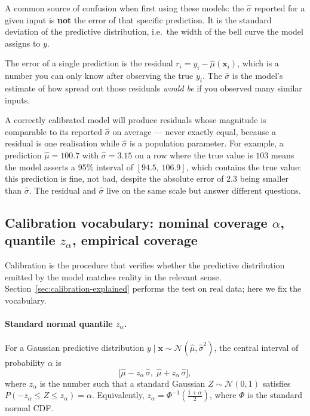 \documentclass[11pt,a4paper]{article}
\begin{document}
\begin{recapbox}
A common source of confusion when first using these models: the $\hat\sigma$ reported for a given input is \textbf{not} the error of that specific prediction. It is the standard deviation of the predictive distribution, i.e.\ the width of the bell curve the model assigns to $y$.

The error of a single prediction is the residual $r_i = y_i - \hat\mu(\bm x_i)$, which is a number you can only know after observing the true $y_i$. The $\hat\sigma$ is the model's estimate of how spread out those residuals \emph{would be} if you observed many similar inputs.

A correctly calibrated model will produce residuals whose magnitude is comparable to its reported $\hat\sigma$ on average --- never exactly equal, because a residual is one realisation while $\hat\sigma$ is a population parameter. For example, a prediction $\hat\mu = 100.7$ with $\hat\sigma = 3.15$ on a row where the true value is $103$ means the model asserts a 95\% interval of $[94.5,\, 106.9]$, which contains the true value: this prediction is fine, not bad, despite the absolute error of $2.3$ being smaller than $\hat\sigma$. The residual and $\hat\sigma$ live on the same scale but answer different questions.
\end{recapbox}

\subsection{Calibration vocabulary: nominal coverage \texorpdfstring{$\alpha$}{alpha}, quantile \texorpdfstring{$z_\alpha$}{z-alpha}, empirical coverage}
\label{sec:calibration-vocab}

Calibration is the procedure that verifies whether the predictive distribution emitted by the model matches reality in the relevant sense. Section~\ref{sec:calibration-explained} performs the test on real data; here we fix the vocabulary.

\paragraph{Standard normal quantile $z_\alpha$.} For a Gaussian predictive distribution $y \mid \bm x \sim \mathcal{N}(\hat\mu, \hat\sigma^2)$, the central interval of probability $\alpha$ is
\[
\big[\hat\mu - z_\alpha \, \hat\sigma,\; \hat\mu + z_\alpha \, \hat\sigma\big],
\]
where $z_\alpha$ is the number such that a standard Gaussian $Z \sim \mathcal{N}(0, 1)$ satisfies $P(-z_\alpha \leq Z \leq z_\alpha) = \alpha$. Equivalently, $z_\alpha = \Phi^{-1}\!\left(\tfrac{1+\alpha}{2}\right)$, where $\Phi$ is the standard normal CDF.
\end{document}
